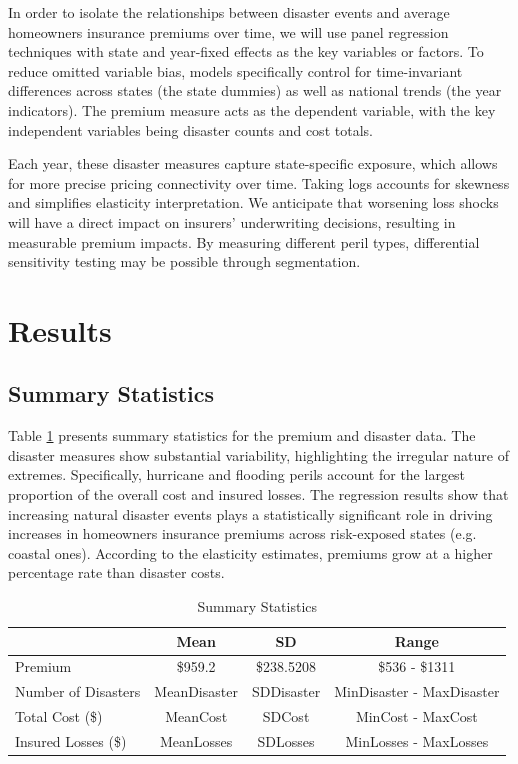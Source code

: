 \documentclass[12pt]{article}
\begin{document}
In order to isolate the relationships between disaster events and average homeowners insurance premiums over time, we will use 
panel regression techniques with state and year-fixed effects as the key variables or factors. To reduce omitted variable bias, 
models specifically control for time-invariant differences across states (the state dummies) as well as national trends (the year 
indicators). The premium measure acts as the dependent variable, with the key independent variables being disaster counts and 
cost totals.

Each year, these disaster measures capture state-specific exposure, which allows for more precise pricing connectivity over time. Taking logs 
accounts for skewness and simplifies elasticity interpretation. We anticipate that worsening loss shocks will have a direct impact on 
insurers' underwriting decisions, resulting in measurable premium impacts. By measuring different peril types, differential sensitivity testing 
may be possible through segmentation.


\section{Results}
\label{sec:resu}
\subsection{Summary Statistics}
Table \ref{tab:summary} presents summary statistics for the premium and disaster data. The disaster measures show substantial variability, 
highlighting the irregular nature of extremes. Specifically, hurricane and flooding perils account for the largest proportion of the overall cost and 
insured losses. The regression results show that increasing natural disaster events plays a statistically significant role in 
driving increases in homeowners insurance premiums across risk-exposed states (e.g. coastal ones). According to the elasticity estimates, premiums grow 
at a higher percentage rate than disaster costs.

\begin{table}[h]
    \label{tab:summary}
    \centering
    \begin{tabular}{|l|c|c|c|}
        \hline
        & Mean & SD & Range \\
        \hline
        Premium & \$\num{959.2} & \$\num{238.5208} & \$\num{536} - \$\num{1311} \\
        Number of Disasters & MeanDisaster & SDDisaster & MinDisaster - MaxDisaster \\
        Total Cost (\$) & MeanCost & SDCost & MinCost - MaxCost \\
        Insured Losses (\$) & MeanLosses & SDLosses & MinLosses - MaxLosses \\
        \hline
    \end{tabular}
    \caption{Summary Statistics}
    \cite{statista, ncei, FEMA}
\end{table}
\end{document}
